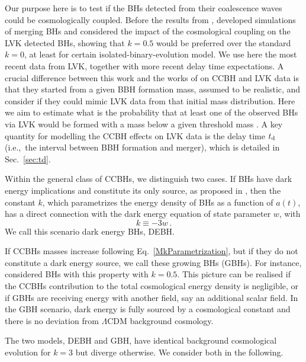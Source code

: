 \documentclass[fleqn,usenatbib,useAMS]{mnras}
\begin{document}
Our purpose here is to test if the BHs detected from their coalescence waves could be cosmologically coupled. Before the results from \citet{Farrah:2023opk}, \citet{Croker:2021duf}  \citep[see also][]{Croker:2019kje} developed simulations of merging BHs and considered the impact of the cosmological coupling on the LVK detected BHs, showing that $k=0.5$ would be preferred over the standard $k=0$, at least for certain isolated-binary-evolution model. We use here the most recent data from LVK, together with more recent delay time expectations.  A crucial difference between this work and  the
works of \citet{Croker:2021duf, Ghodla:2023iaz} on CCBH and LVK data is that they started
from a given BBH formation mass, assumed to be realistic, and consider if they could mimic LVK data from that initial mass distribution. Here we aim to estimate what is the probability that at least one of the observed BHs via LVK would be {formed with a mass below a given threshold mass} \citep[thus in part similar to][]{Rodriguez:2023gaa}. A key quantity for modelling the CCBH effects on LVK data is the delay time $t_{\rm d}$ (i.e.,~the interval between BBH formation and merger), which is detailed in Sec.~\ref{sec:td}.

Within the general class of CCBHs, we distinguish two cases.
If BHs have dark energy implications and constitute its only source, as proposed in \citep{Croker:2020plg, Farrah:2023opk}, then the constant $k$, which parametrizes the energy density of BHs as a function of $a(t)$, has  a direct connection with the dark energy equation of state parameter $w$, with  
\begin{equation}
    k \equiv - 3 w \, .\label{kEquals3w}
\end{equation} 
We call this scenario dark energy BHs, DEBH.

If CCBHs masses increase following  Eq.~\eqref{MkParametrization}, but if they do not constitute a dark energy source, we call these growing BHs (GBHs). For instance, \citet{Croker:2021duf} considered BHs with this property with $k=0.5$. This picture can be realised if the CCBHs contribution to the total cosmological energy density is negligible, or if GBHs are receiving energy with another field, say an additional scalar field. In the GBH scenario, dark energy is fully sourced by a cosmological constant and there is no deviation from $\Lambda$CDM  background cosmology. 

The two models, DEBH and GBH, have identical background cosmological evolution  for $k=3$ but diverge otherwise. 
We consider both in the following.
\end{document}
